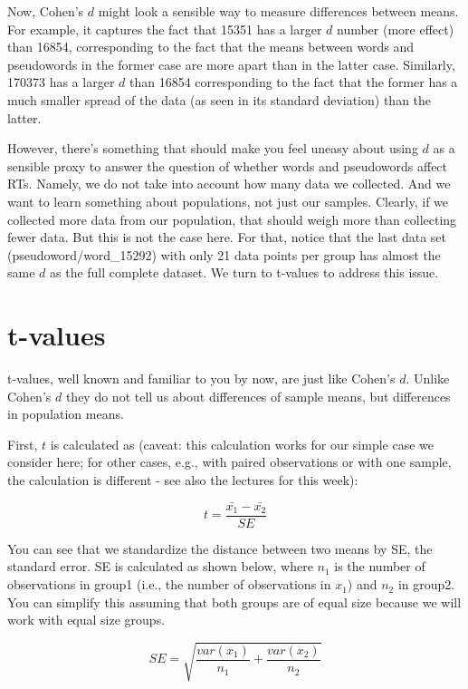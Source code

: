 \documentclass{article}\usepackage[]{graphicx}\usepackage[]{color}
\begin{document}
Now, Cohen's $d$ might look a sensible way to measure differences between means. For example, it captures the fact that 15351 has a larger $d$ number (more effect) than 16854, corresponding to the fact that the means between words and pseudowords in the former case are more apart than in the latter case. Similarly, 170373 has a larger $d$ than 16854 corresponding to the fact that the former has a much smaller spread of the data (as seen in its standard deviation) than the latter.

However, there's something that should make you feel uneasy about using $d$ as a sensible proxy to answer the question of whether words and pseudowords affect RTs. Namely, we do not take into account how many data we collected. And we want to learn something about populations, not just our samples. Clearly, if we collected more data from our population, that should weigh more than collecting fewer data. But this is not the case here. For that, notice that the last data set (pseudoword/word\_15292) with only 21 data points per group has almost the same $d$ as the full complete dataset. We turn to t-values to address this issue.

\section{t-values}

t-values, well known and familiar to you by now, are just like Cohen's $d$. Unlike Cohen's $d$ they do not tell us about differences of sample means, but differences in population means.

First, $t$ is calculated as (caveat: this calculation works for our simple case we consider here; for other cases, e.g., with paired observations or with one sample, the calculation is different - see also the lectures for this week):


\begin{equation}
    t=\frac{\bar{x_1} - \bar{x_2}}{SE}
\end{equation}

You can see that we standardize the distance between two means by SE, the standard error.
SE is calculated as shown below, where $n_1$ is the number of observations in group1 (i.e., the number of observations in $x_1$) and $n_2$ in group2. You can simplify this assuming that both groups are of equal size because we will work with equal size groups.

\begin{equation}
    SE=\sqrt{\frac{var(x_1)}{n_1} + \frac{var(x_2)}{n_2}}
\end{equation}
\end{document}
